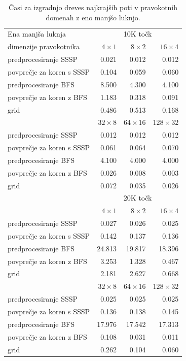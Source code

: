 \documentclass[a4paper, 12pt]{book}
\begin{document}
\begin{table}
\begin{center}
\begin{tabular}{l*{3}{r}}
Ena manjša luknja & \multicolumn{3}{c}{10K točk}\\						
dimenzije pravokotnika	&	$4\times 1$	&	$8\times 2$	&	$16\times 4$		\\
\hline
predprocesiranje SSSP	&	0.021	&	0.012	&	0.012		\\
povprečje za koren s SSSP	&	0.104	&	0.059	&	0.060		\\
predprocesiranje BFS	&	8.500	&	4.300	&	4.100		\\
povprečje za koren z BFS	&	1.183	&	0.318	&	0.091		\\
grid	&	0.486	&	0.513	&	0.168  \vspace{.2cm}	\\
&	$32\times 8$	&	$64\times 16$	&	$128\times 32$ \\
predprocesiranje SSSP &	0.012	&	0.012	&	0.012 \\
povprečje za koren s SSSP &	0.061	&	0.064	&	0.070 \\
predprocesiranje BFS &	4.100	&	4.000	&	4.000 \\
povprečje za koren z BFS &	0.026	&	0.008	&	0.003 \\
grid &	0.072	&	0.035	&	0.026\vspace{.2cm} \\
\hline
  & \multicolumn{3}{c}{20K točk}\\
  &	$4\times 1$	&	$8\times 2$	&	$16\times 4$		\\  			
\hline
predprocesiranje SSSP	&	0.027	&	0.026	&	0.025	\\
povprečje za koren s SSSP	&	0.142	&	0.137	&	0.136	\\
predprocesiranje BFS	&	24.813	&	19.817	&	18.396	\\
povprečje za koren z BFS	&	3.253	&	1.328	&	0.467	\\
grid				&	2.181	&	2.627	&	0.668	\\
&	$32\times 8$	&	$64\times 16$	&	$128\times 32$ \\
predprocesiranje SSSP &	0.025	&	0.025	&	0.025	\\
povprečje za koren s SSSP &	0.136	&	0.138	&	0.145	\\
predprocesiranje BFS &	17.976	&	17.542	&	17.313	\\
povprečje za koren z BFS &	0.108	&	0.031	&	0.011	\\
grid &	0.262	&	0.104	&	0.060 
\end{tabular}
\caption{Časi za izgradnjo dreves najkrajših poti v pravokotnih domenah z eno manjšo luknjo.}
\label{table2}
\end{center}
\end{table}
\end{document}
